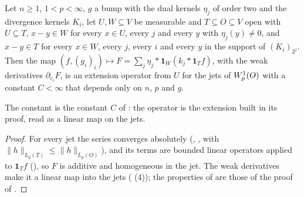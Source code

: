 \begin{lemma}
\label{lem:sobolev-extension-op-patch}
\leanok
{}
Let $n \geq 1$, $1 < p < \infty$, $g$ a bump with the dual kernels $\eta_j$ of order two and the
divergence kernels $K_i$, let $U, W \subseteq V$ be measurable and $T \subseteq O \subseteq V$
open with $U \subseteq T$, $x - y \in W$ for every $x \in U$, every $j$ and every $y$ with
$\eta_j(y) \neq 0$, and $x - y \in T$ for every $x \in W$, every $j$, every $i$ and every $y$ in
the support of $(K_i)_{2^j}$. Then the map
$(f, (g_i)_i) \mapsto F = \sum_j \eta_j * \mathbf 1_W (k_j * \mathbf 1_T f)$, with the weak
derivatives $\partial_{e_i} F$, is an extension operator from $U$ for the jets of
$W^{1}_{p}(O)$ with a constant $C < \infty$ that depends only on $n$, $p$ and $g$.
\end{lemma}

The constant is the constant $C$ of : the operator is the
extension built in its proof, read as a linear map on the jets.

\begin{proof}
\leanok
For every jet the series converges absolutely (,
, with $\|h\|_{L_p(T)} \leq \|h\|_{L_p(O)}$), and its terms are
bounded linear operators applied to $\mathbf 1_T f$ (), so $F$ is
additive and homogeneous in the jet. The weak derivatives make it a linear map into the jets
( (4)); the properties of  are those of the
proof of .
\end{proof}

